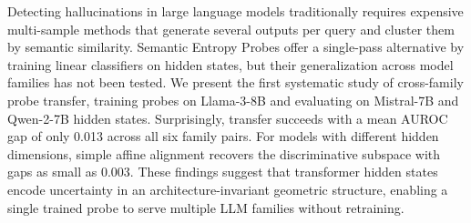 Detecting hallucinations in large language models traditionally requires expensive multi-sample methods that generate several outputs per query and cluster them by semantic similarity. Semantic Entropy Probes offer a single-pass alternative by training linear classifiers on hidden states, but their generalization across model families has not been tested. We present the first systematic study of cross-family probe transfer, training probes on Llama-3-8B and evaluating on Mistral-7B and Qwen-2-7B hidden states. Surprisingly, transfer succeeds with a mean AUROC gap of only 0.013 across all six family pairs. For models with different hidden dimensions, simple affine alignment recovers the discriminative subspace with gaps as small as 0.003. These findings suggest that transformer hidden states encode uncertainty in an architecture-invariant geometric structure, enabling a single trained probe to serve multiple LLM families without retraining.
